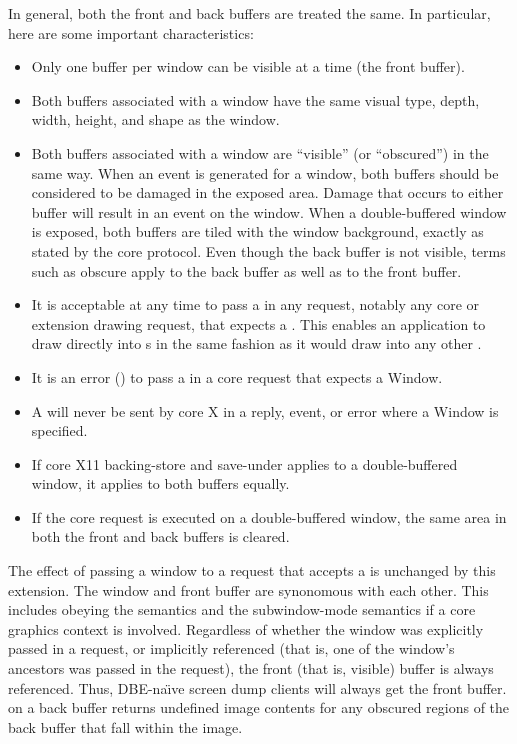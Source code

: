 In general, both the front and back buffers are treated the same.  In
particular, here are some important characteristics:

\begin{itemize}

\item Only one buffer per window can be visible at a time (the
front buffer).

\item Both buffers associated with a window have the same visual type,
depth, width, height, and shape as the window.

\item Both buffers associated with a window are ``visible'' (or
``obscured'') in the same way.  When an  event is
generated for
a window, both buffers should be considered to be damaged in the
exposed area.  Damage that occurs to either buffer will result in an
 event on the window.  When a double-buffered window is
exposed,
both buffers are tiled with the window background, exactly as stated
by the core protocol.  Even though the back buffer is not visible,
terms such as obscure apply to the back buffer as well as to the front
buffer.

\item It is acceptable at any time to pass a  in
any request, notably any core or extension drawing request, that
expects a .  This enables an application to draw
directly into s in the same fashion as it would
draw into any other .

\item It is an error () to pass a  in a
core request that expects a Window.

\item A  will never be sent by core X in a reply,
event, or error where a Window is specified.
\item If core X11 backing-store and save-under applies to a
double-buffered window, it applies to both buffers equally.

\item If the core  request is executed on a
double-buffered window, the same area in both the front and back
buffers is cleared.

\end{itemize}

The effect of passing a window to a request that accepts a
 is unchanged by this extension.  The window and
front buffer are synonomous with each other.  This includes obeying
the  semantics and the subwindow-mode semantics
if a core graphics context is involved.  Regardless of whether the
window was explicitly passed in a  request, or
implicitly referenced (that is, one of the window's ancestors was passed
in the request), the front (that is, visible) buffer is always referenced.
Thus, DBE-na\"{\i}ve screen dump clients will always get the front buffer.
 on a back buffer returns undefined image
contents for any obscured regions of the back buffer that fall within
the image.


